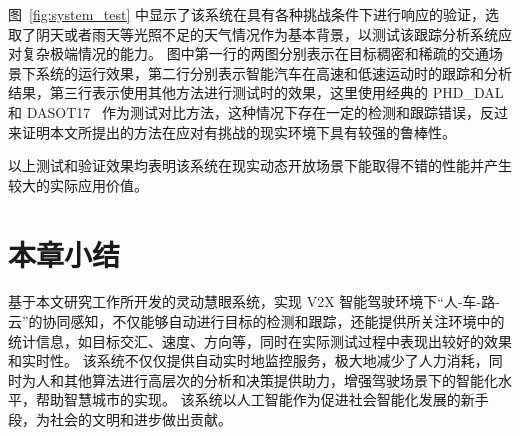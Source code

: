 图~\ref{fig:system_test} 中显示了该系统在具有各种挑战条件下进行响应的验证，选取了阴天或者雨天等光照不足的天气情况作为基本背景，以测试该跟踪分析系统应对复杂极端情况的能力。
图中第一行的两图分别表示在目标稠密和稀疏的交通场景下系统的运行效果，第二行分别表示智能汽车在高速和低速运动时的跟踪和分析结果，第三行表示使用其他方法进行测试时的效果，这里使用经典的 PHD\_DAL~\cite{2019Online} 和 DASOT17~\citep{chu2020dasot} 作为测试对比方法，这种情况下存在一定的检测和跟踪错误，反过来证明本文所提出的方法在应对有挑战的现实环境下具有较强的鲁棒性。

以上测试和验证效果均表明该系统在现实动态开放场景下能取得不错的性能并产生较大的实际应用价值。



\section{本章小结}
基于本文研究工作所开发的灵动慧眼系统，实现 V2X 智能驾驶环境下“人-车-路-云”的协同感知，不仅能够自动进行目标的检测和跟踪，还能提供所关注环境中的统计信息，如目标交汇、速度、方向等，同时在实际测试过程中表现出较好的效果和实时性。
该系统不仅仅提供自动实时地监控服务，极大地减少了人力消耗，同时为人和其他算法进行高层次的分析和决策提供助力，增强驾驶场景下的智能化水平，帮助智慧城市的实现。
该系统以人工智能作为促进社会智能化发展的新手段，为社会的文明和进步做出贡献。




